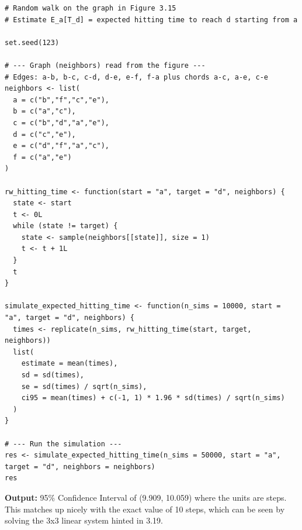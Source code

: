 \documentclass[hidelinks]{article}
\begin{document}
\begin{lstlisting}[caption={Monte Carlo Simulation}]
# Random walk on the graph in Figure 3.15
# Estimate E_a[T_d] = expected hitting time to reach d starting from a

set.seed(123)

# --- Graph (neighbors) read from the figure ---
# Edges: a-b, b-c, c-d, d-e, e-f, f-a plus chords a-c, a-e, c-e
neighbors <- list(
  a = c("b","f","c","e"),
  b = c("a","c"),
  c = c("b","d","a","e"),
  d = c("c","e"),
  e = c("d","f","a","c"),
  f = c("a","e")
)

rw_hitting_time <- function(start = "a", target = "d", neighbors) {
  state <- start
  t <- 0L
  while (state != target) {
    state <- sample(neighbors[[state]], size = 1)
    t <- t + 1L
  }
  t
}

simulate_expected_hitting_time <- function(n_sims = 10000, start = "a", target = "d", neighbors) {
  times <- replicate(n_sims, rw_hitting_time(start, target, neighbors))
  list(
    estimate = mean(times),
    sd = sd(times),
    se = sd(times) / sqrt(n_sims),
    ci95 = mean(times) + c(-1, 1) * 1.96 * sd(times) / sqrt(n_sims)
  )
}

# --- Run the simulation ---
res <- simulate_expected_hitting_time(n_sims = 50000, start = "a", target = "d", neighbors = neighbors)
res
\end{lstlisting}


\noindent \textbf{Output:} 95\% Confidence Interval of (9.909, 10.059) where the units are steps. This matches up nicely with the exact value of 10 steps, which can be seen by solving the 3x3 linear system hinted in 3.19.
\end{document}
